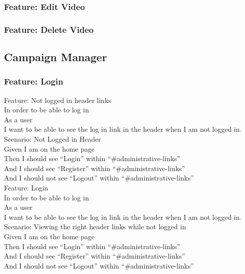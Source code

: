 \documentclass[12pt]{article}
\begin{document}
\subsubsection{Feature: Edit Video}
\subsubsection{Feature: Delete Video}

\subsection{Campaign Manager}

\subsubsection{Feature: Login}

Feature: Not logged in header links \\
In order to be able to log in \\
As a user \\
I want to be able to see the log in link in the header when I am not logged in. \\

Scenario: Not Logged in Header  \\
Given I am on the home page \\
Then I should see ``Login'' within ``\#administrative-links'' \\
And I should see ``Register'' within ``\#administrative-links'' \\
And I should not see ``Logout'' within ``\#administrative-links'' \\

Feature: Login \\
  In order to be able to log in \\
  As a user \\
  I want to be able to see the log in link in the header when I am not logged in. \\

Scenario: Viewing the right header links while not logged in  \\
  Given I am on the home page \\
  Then I should see ``Login'' within ``\#administrative-links'' \\
  And I should see ``Register'' within ``\#administrative-links'' \\
  And I should not see ``Logout'' within ``\#administrative-links'' \\
\end{document}

